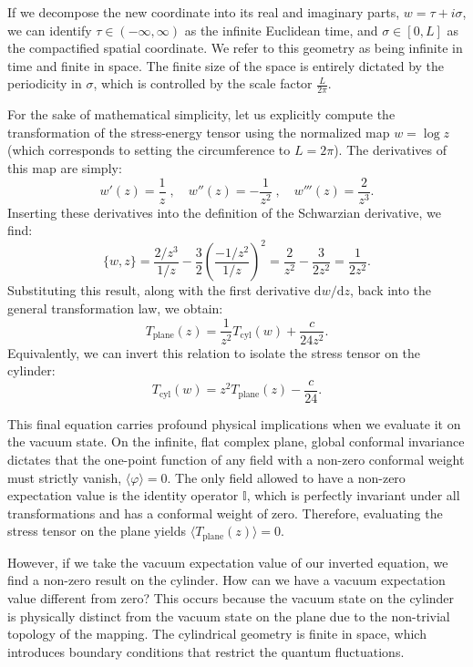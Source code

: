 If we decompose the new coordinate into its real and imaginary parts, \(w = \tau + i\sigma\), we can identify \(\tau \in (-\infty, \infty)\) as the infinite Euclidean time, and \(\sigma \in [0, L]\) as the compactified spatial coordinate. We refer to this geometry as being infinite in time and finite in space. The finite size of the space is entirely dictated by the periodicity in \(\sigma\), which is controlled by the scale factor \(\frac{L}{2\pi}\).

For the sake of mathematical simplicity, let us explicitly compute the transformation of the stress-energy tensor using the normalized map \(w = \log z\) (which corresponds to setting the circumference to \(L = 2\pi\)). The derivatives of this map are simply:
\[
    w'(z) = \frac{1}{z} \;, \quad w''(z) = -\frac{1}{z^2} \;, \quad w'''(z) = \frac{2}{z^3}.
\]
Inserting these derivatives into the definition of the Schwarzian derivative, we find:
\[
    \{w, z\} = \frac{2/z^3}{1/z} - \frac{3}{2}\left(\frac{-1/z^2}{1/z}\right)^2 = \frac{2}{z^2} - \frac{3}{2z^2} = \frac{1}{2z^2}.
\]
Substituting this result, along with the first derivative \(\mathrm{d} w/\mathrm{d} z\), back into the general transformation law, we obtain:
\[
    T_{\text{plane}}(z) = \frac{1}{z^2} T_{\text{cyl}}(w) + \frac{c}{24z^2}.
\]
Equivalently, we can invert this relation to isolate the stress tensor on the cylinder:
\[
    T_{\text{cyl}}(w) = z^2 T_{\text{plane}}(z) - \frac{c}{24}.
\]

This final equation carries profound physical implications when we evaluate it on the vacuum state. On the infinite, flat complex plane, global conformal invariance dictates that the one-point function of any field with a non-zero conformal weight must strictly vanish, \(\langle \varphi \rangle = 0\). The only field allowed to have a non-zero expectation value is the identity operator \(\mathbb{I}\), which is perfectly invariant under all transformations and has a conformal weight of zero. Therefore, evaluating the stress tensor on the plane yields \(\langle T_{\text{plane}}(z) \rangle = 0\).

However, if we take the vacuum expectation value of our inverted equation, we find a non-zero result on the cylinder. How can we have a vacuum expectation value different from zero? This occurs because the vacuum state on the cylinder is physically distinct from the vacuum state on the plane due to the non-trivial topology of the mapping. The cylindrical geometry is finite in space, which introduces boundary conditions that restrict the quantum fluctuations.

